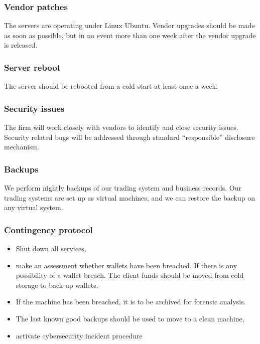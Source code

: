 \subsubsection{Vendor patches}
The servers are operating under Linux Ubuntu.  Vendor upgrades should
be made as soon as possible, but in no event more than one week after
the vendor upgrade is released.

\subsubsection{Server reboot}
The server should be rebooted from a cold start at least once a week.

\subsubsection{Security issues}
The firm will work closely with vendors to identify and close security
issues.  Security related bugs will be addressed through standard
``responsible'' disclosure mechanism.

\subsubsection{Backups}
We perform nightly backups of our trading system and business
records.  Our trading systems are set up as virtual machines, and we can
restore the backup on any virtual system.

\subsubsection{Contingency protocol}
\begin{itemize}
\item Shut down all services,
  \item make an assessment whether wallets have been breached.  If
    there is any possibility of a wallet breach.  The client funds should be
    moved from cold storage to back up wallets.
\item If the machine has been breached, it is to be archived for
  forensic analysis.
\item The last known good backups should be used to
  move to a clean machine,
\item activate cybersecurity incident procedure
\end{itemize}

